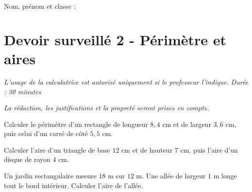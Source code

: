 \documentclass[a4paper,10pt]{report}
\begin{document}
\pagestyle{empty}
\noindent Nom, prénom et classe : \dotfill

\section*{Devoir surveillé 2 - Périmètre et aires}

\noindent \textit{L'usage de la calculatrice est autorisé uniquement si le professeur l'indique.} \hfill \textit{Durée : 30 minutes}

\medskip
\noindent \textit{La rédaction, les justifications et la propreté seront prises en compte.}


\begin{ex}[Périmètre]
Calculer le périmètre d'un rectangle de longueur $8,4$ cm et de largeur $3,6$ cm, puis celui d'un carré de côté $5,5$ cm.
\medskip\noindent\grandscarreaux{\linewidth}{3.5cm}
\end{ex}
\begin{ex}[Aire]
Calculer l'aire d'un triangle de base $12$ cm et de hauteur $7$ cm, puis l'aire d'un disque de rayon $4$ cm.
\medskip\noindent\grandscarreaux{\linewidth}{4cm}
\end{ex}
\begin{ex}[Problème]
Un jardin rectangulaire mesure $18$ m sur $12$ m. Une allée de largeur $1$ m longe tout le bord intérieur. Calculer l'aire de l'allée.
\medskip\noindent\grandscarreaux{\linewidth}{5cm}
\end{ex}
\end{document}
